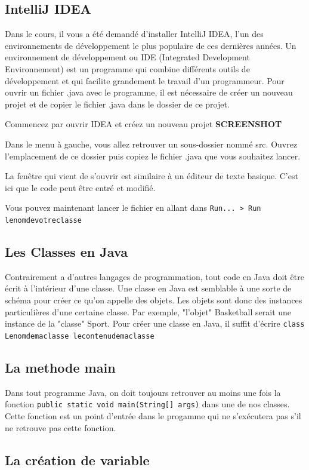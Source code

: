 \subsection{IntelliJ IDEA}

Dans le cours, il vous a été demandé d'installer IntelliJ IDEA, l'un des environnements de développement le plus populaire de ces dernières années. Un environnement de développement ou IDE (Integrated Development Environnement) est un programme qui combine différents outils de développement et qui facilite grandement le travail d'un programmeur. Pour ouvrir un fichier .java avec le programme, il est nécessaire de créer un nouveau projet et de copier le fichier .java dans le dossier de ce projet.

Commencez par ouvrir IDEA et créez un nouveau projet \textbf{SCREENSHOT}

Dans le menu à gauche, vous allez retrouver un sous-dossier nommé src. Ouvrez l'emplacement de ce dossier puis copiez le fichier .java que vous souhaitez lancer.

La fenêtre qui vient de s'ouvrir est similaire à un éditeur de texte basique. C'est ici que le code peut être entré et modifié.

Vous pouvez maintenant lancer le fichier en allant dans \lstinline{Run... > Run lenomdevotreclasse}

\subsection{Les Classes en Java}

Contrairement a d'autres langages de programmation, tout code en Java doit être écrit à l'intérieur d'une classe. Une classe en Java est semblable à une sorte de schéma pour créer ce qu'on appelle des objets. Les objets sont donc des instances particulières d'une certaine classe. Par exemple, "l'objet" Basketball serait une instance de la "classe" Sport. Pour créer une classe en Java, il suffit d'écrire \lstinline{class Lenomdemaclasse lecontenudemaclasse }

\subsection{La methode main}
Dans tout programme Java, on doit toujours retrouver au moins une fois la fonction \lstinline{public static void main(String[] args)} dans une de nos classes. Cette fonction est un point d'entrée dans le progamme qui ne s'exécutera pas s'il ne retrouve pas cette fonction.
\subsection{La création de variable}


